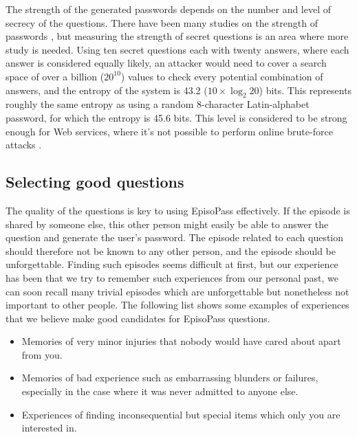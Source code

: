 \documentclass[runningheads,a4paper]{llncs}
\begin{document}
The strength of the generated passwords depends on the number and 
level of secrecy of the questions.
%
There have been many studies on the strength of passwords
\cite{Hayashi:2011:DSP:1978942.1979326,Komanduri:2011:PPM:1978942.1979321}, %
but measuring the strength of secret questions is an area where more study is needed.
%
%
Using ten secret questions each with twenty answers, where each answer is considered equally likely,
an attacker would need to cover a search space of over a billion ($20^{10}$) values to check
every potential combination of answers,
and the entropy of the system is 43.2 ($10 \times \log_2 20$) bits.  %
%
This represents roughly the same entropy as using a random 8-character Latin-alphabet
password, for which the entropy is 45.6 bits.
This level is considered to be strong enough for Web services,
where it's not possible to perform online brute-force attacks \cite{Florencio:2007:SWP:1361419.1361429}.

\subsection{Selecting good questions}

The quality of the questions is key to using EpisoPass effectively.
If the episode is shared by someone else,
this other person might easily be able to answer the question and generate the
user's password.
%
The episode related to each question should therefore not be known to any other person,
and the episode should be unforgettable.
%
Finding such episodes seems difficult at first, but our experience
has been that we try to remember such experiences from our personal past,
we can soon recall many trivial episodes which are unforgettable but
nonetheless not important to other people.
%
The following list shows some examples of experiences that we believe make good candidates for
EpisoPass questions.

\begin{itemize}
\item Memories of very minor injuries that nobody would have cared about apart from you.

\item Memories of bad experience such as embarrassing blunders or failures, especially in the case where
it was never admitted to anyone else.

\item Experiences of finding inconsequential but special items which only you are interested in.
\end{itemize}
\end{document}
